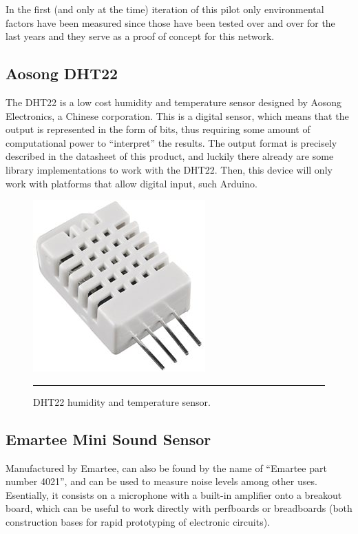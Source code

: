 In the first (and only at the time) iteration of this pilot only environmental factors have been measured since those have been tested over and over for the last years and they serve as a proof of concept for this network.

\subsection{Aosong DHT22}

The DHT22\citep{dht22sensor} is a low cost humidity and temperature sensor designed by Aosong Electronics, a Chinese corporation. This is a digital sensor, which means that the output is represented in the form of bits, thus requiring some amount of computational power to ``interpret'' the results. The output format is precisely described in the datasheet of this product, and luckily there already are some library implementations to work with the DHT22. Then, this device will only work with platforms that allow digital input, such Arduino.

\begin{figure}[htbp]
    \centering
        \includegraphics[scale=0.8]{./Figures/dht22.jpg}
        \rule{35em}{0.5pt}
    \caption[DHT22 sensor]{DHT22 humidity and temperature sensor.}
    \label{fig:DHT22}
\end{figure}



\subsection{Emartee Mini Sound Sensor}

Manufactured by Emartee, can also be found by the name of ``Emartee part number 4021'', and can be used to measure noise levels among other uses. Esentially, it consists on a microphone with a built-in amplifier onto a breakout board, which can be useful to work directly with perfboards or breadboards (both construction bases for rapid prototyping of electronic circuits).

